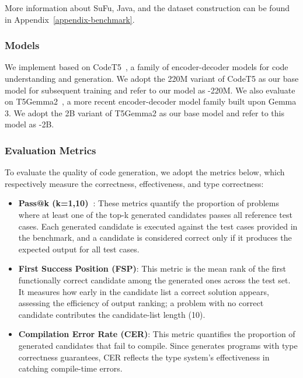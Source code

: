 More information about SuFu, Java, and the dataset construction can be found in Appendix~\ref{appendix-benchmark}.

\subsubsection{Models}
We implement \mainname based on CodeT5~\cite{DBLP:conf/emnlp/0034WJH21}, a family of encoder-decoder models for code understanding and generation. We adopt the 220M variant of CodeT5 as our base model for subsequent training and refer to our model as \mainname-220M. 
We also evaluate \mainname on T5Gemma2~\cite{zhang2025t5gemma2seeingreading}, a more recent encoder-decoder model family built upon Gemma 3. We adopt the 2B variant of T5Gemma2 as our base model and refer to this model as \mainname-2B. 

\subsubsection{Evaluation Metrics} 
\label{sec:evaluation-metrics}
To evaluate the quality of code generation, we adopt the metrics below, which respectively measure the correctness, effectiveness, and type correctness:

\begin{itemize}
    \item \textbf{Pass@k (k=1,10)~\cite{DBLP:journals/corr/abs-2107-03374}}: These metrics quantify the proportion of problems where at least one of the top-k generated candidates passes all reference test cases. Each generated candidate is executed against the test cases provided in the benchmark, and a candidate is considered correct only if it produces the expected output for all test cases. 

    \item \textbf{First Success Position (FSP)}: This metric is the mean rank of the first functionally correct candidate among the generated ones across the test set. It measures how early in the candidate list a correct solution appears, assessing the efficiency of output ranking; a problem with no correct candidate contributes the candidate-list length (10).

    \item \textbf{Compilation Error Rate (CER)}: This metric quantifies the proportion of generated candidates that fail to compile. 
    Since \mainname generates programs with type correctness guarantees, CER reflects the type system's effectiveness in catching compile-time errors. 
\end{itemize}

